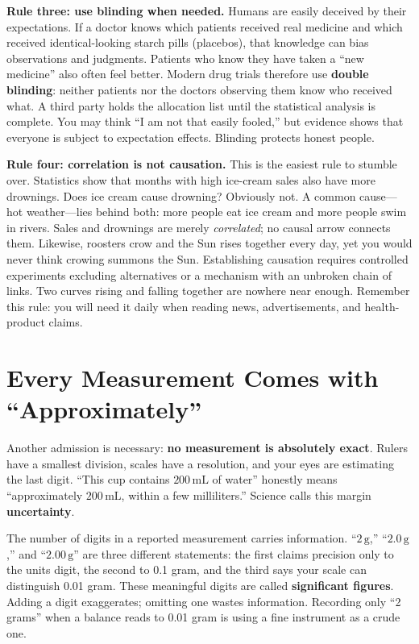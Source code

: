 \textbf{Rule three: use blinding when needed.} Humans are easily deceived by their expectations. If a doctor knows which patients received real medicine and which received identical-looking starch pills (placebos), that knowledge can bias observations and judgments. Patients who know they have taken a ``new medicine'' also often feel better. Modern drug trials therefore use \textbf{double blinding}: neither patients nor the doctors observing them know who received what. A third party holds the allocation list until the statistical analysis is complete. You may think ``I am not that easily fooled,'' but evidence shows that everyone is subject to expectation effects. Blinding protects honest people.

\textbf{Rule four: correlation is not causation.} This is the easiest rule to stumble over. Statistics show that months with high ice-cream sales also have more drownings. Does ice cream cause drowning? Obviously not. A common cause---hot weather---lies behind both: more people eat ice cream and more people swim in rivers. Sales and drownings are merely \emph{correlated}; no causal arrow connects them. Likewise, roosters crow and the Sun rises together every day, yet you would never think crowing summons the Sun. Establishing causation requires controlled experiments excluding alternatives or a mechanism with an unbroken chain of links. Two curves rising and falling together are nowhere near enough. Remember this rule: you will need it daily when reading news, advertisements, and health-product claims.

\section{Every Measurement Comes with ``Approximately''}

Another admission is necessary: \textbf{no measurement is absolutely exact}. Rulers have a smallest division, scales have a resolution, and your eyes are estimating the last digit. ``This cup contains $200\,\mathrm{mL}$ of water'' honestly means ``approximately $200\,\mathrm{mL}$, within a few milliliters.'' Science calls this margin \textbf{uncertainty}.

The number of digits in a reported measurement carries information. ``$2\,\mathrm{g}$,'' ``$2.0\,\mathrm{g}$,'' and ``$2.00\,\mathrm{g}$'' are three different statements: the first claims precision only to the units digit, the second to 0.1 gram, and the third says your scale can distinguish 0.01 gram. These meaningful digits are called \textbf{significant figures}. Adding a digit exaggerates; omitting one wastes information. Recording only ``2 grams'' when a balance reads to 0.01 gram is using a fine instrument as a crude one.

